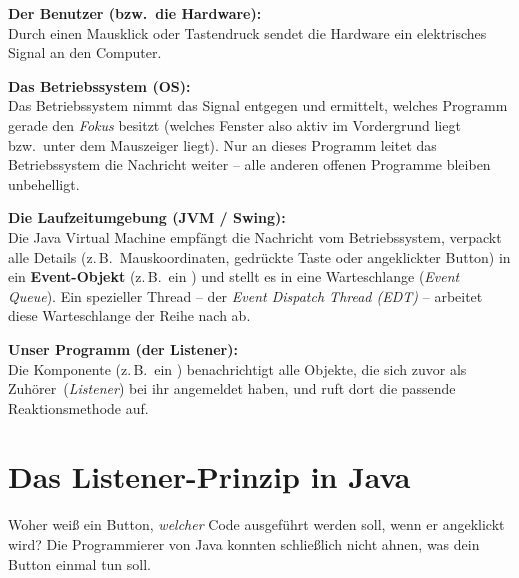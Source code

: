 \begin{compactenum}[1.]
  \item \textbf{Der Benutzer (bzw.\ die Hardware):}\\
  Durch einen Mausklick oder Tastendruck sendet die Hardware ein elektrisches
  Signal an den Computer.

  \item \textbf{Das Betriebssystem (OS):}\\
  Das Betriebssystem nimmt das Signal entgegen und ermittelt, welches Programm
  gerade den \emph{Fokus} besitzt (welches Fenster also aktiv im Vordergrund
  liegt bzw.\ unter dem Mauszeiger liegt). Nur an dieses Programm leitet das
  Betriebssystem die Nachricht weiter -- alle anderen offenen Programme bleiben
  unbehelligt.

  \item \textbf{Die Laufzeitumgebung (JVM / Swing):}\\
  Die Java Virtual Machine empfängt die Nachricht vom Betriebssystem, verpackt
  alle Details (z.\,B.\ Mauskoordinaten, gedrückte Taste oder angeklickter
  Button) in ein \textbf{Event-Objekt} (z.\,B.\ ein ) und
  stellt es in eine Warteschlange (\emph{Event Queue}). Ein spezieller Thread
  -- der \emph{Event Dispatch Thread (EDT)} -- arbeitet diese Warteschlange
  der Reihe nach ab.

  \item \textbf{Unser Programm (der Listener):}\\
  Die Komponente (z.\,B.\ ein ) benachrichtigt alle
  Objekte, die sich zuvor als \glqq Zuhörer\grqq\ (\emph{Listener}) bei ihr
  angemeldet haben, und ruft dort die passende Reaktionsmethode auf.
\end{compactenum}

\medskip
\begin{center}
\end{center}


\section{Das Listener-Prinzip in Java}

Woher weiß ein Button, \emph{welcher} Code ausgeführt werden soll, wenn er
angeklickt wird? Die Programmierer von Java konnten schließlich nicht ahnen, was
dein Button einmal tun soll.

